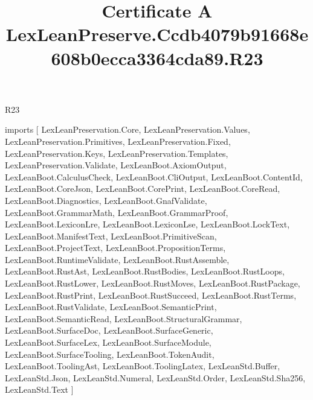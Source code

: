 \begin{lexlean}{R23}
\title{Certificate A LexLeanPreserve.Ccdb4079b91668e608b0ecca3364cda89.R23}
\begin{coremodule}
imports [
  LexLeanPreservation.Core,
  LexLeanPreservation.Values,
  LexLeanPreservation.Primitives,
  LexLeanPreservation.Fixed,
  LexLeanPreservation.Keys,
  LexLeanPreservation.Templates,
  LexLeanPreservation.Validate,
  LexLeanBoot.AxiomOutput,
  LexLeanBoot.CalculusCheck,
  LexLeanBoot.CliOutput,
  LexLeanBoot.ContentId,
  LexLeanBoot.CoreJson,
  LexLeanBoot.CorePrint,
  LexLeanBoot.CoreRead,
  LexLeanBoot.Diagnostics,
  LexLeanBoot.GnafValidate,
  LexLeanBoot.GrammarMath,
  LexLeanBoot.GrammarProof,
  LexLeanBoot.LexiconLre,
  LexLeanBoot.LexiconLse,
  LexLeanBoot.LockText,
  LexLeanBoot.ManifestText,
  LexLeanBoot.PrimitiveScan,
  LexLeanBoot.ProjectText,
  LexLeanBoot.PropositionTerms,
  LexLeanBoot.RuntimeValidate,
  LexLeanBoot.RustAssemble,
  LexLeanBoot.RustAst,
  LexLeanBoot.RustBodies,
  LexLeanBoot.RustLoops,
  LexLeanBoot.RustLower,
  LexLeanBoot.RustMoves,
  LexLeanBoot.RustPackage,
  LexLeanBoot.RustPrint,
  LexLeanBoot.RustSucceed,
  LexLeanBoot.RustTerms,
  LexLeanBoot.RustValidate,
  LexLeanBoot.SemanticPrint,
  LexLeanBoot.SemanticRead,
  LexLeanBoot.StructuralGrammar,
  LexLeanBoot.SurfaceDoc,
  LexLeanBoot.SurfaceGeneric,
  LexLeanBoot.SurfaceLex,
  LexLeanBoot.SurfaceModule,
  LexLeanBoot.SurfaceTooling,
  LexLeanBoot.TokenAudit,
  LexLeanBoot.ToolingAst,
  LexLeanBoot.ToolingLatex,
  LexLeanStd.Buffer,
  LexLeanStd.Json,
  LexLeanStd.Numeral,
  LexLeanStd.Order,
  LexLeanStd.Sha256,
  LexLeanStd.Text
]


\end{coremodule}
\end{lexlean}
